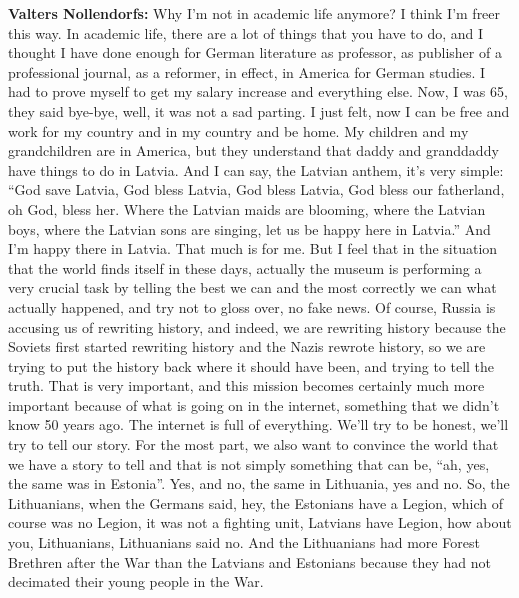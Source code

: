\textbf{Valters Nollendorfs:} Why I'm not in academic life anymore? I think I'm freer this way. In academic life, there are a lot of things that you have to do, and I thought I have done enough for German literature as professor, as publisher of a professional journal, as a reformer, in effect, in America for German studies. I had to prove myself to get my salary increase and everything else. Now, I was 65, they said bye-bye, well, it was not a sad parting. I just felt, now I can be free and work for my country and in my country and be home. My children and my grandchildren are in America, but they understand that daddy and granddaddy have things to do in Latvia. And I can say, the Latvian anthem, it’s very simple: ``God save Latvia, God bless Latvia, God bless Latvia, God bless our fatherland, oh God, bless her. Where the Latvian maids are blooming, where the Latvian boys, where the Latvian sons are singing, let us be happy here in Latvia.'' And I'm happy there in Latvia. That much is for me. But I feel that in the situation that the world finds itself in these days, actually the museum is performing a very crucial task by telling the best we can and the most correctly we can what actually happened, and try not to gloss over, no fake news. Of course, Russia is accusing us of rewriting history, and indeed, we are rewriting history because the Soviets first started rewriting history and the Nazis rewrote history, so we are trying to put the history back where it should have been, and trying to tell the truth. That is very important, and this mission becomes certainly much more important because of what is going on in the internet, something that we didn't know 50 years ago. The internet is full of everything. We’ll try to be honest, we’ll try to tell our story. For the most part, we also want to convince the world that we have a story to tell and that is not simply something that can be, ``ah, yes, the same was in Estonia''. Yes, and no, the same in Lithuania, yes and no. So, the Lithuanians, when the Germans said, hey, the Estonians have a Legion, which of course was no Legion, it was not a fighting unit, Latvians have Legion, how about you, Lithuanians, Lithuanians said no. And the Lithuanians had more Forest Brethren after the War than the Latvians and Estonians because they had not decimated their young people in the War. 
